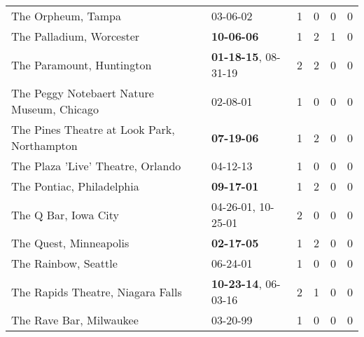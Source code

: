 \begin{longtable}{p{}p{}p{}p{}p{}p{}}
                                                           The Orpheum, Tampa &                                                03-06-02\textsuperscript{} &  1 &  0 &  0 &  0 \\
                                                     The Palladium, Worcester &                                       \textbf{10-06-06\textsuperscript{}} &  1 &  2 &  1 &  0 \\
                                                    The Paramount, Huntington &           \textbf{01-18-15\textsuperscript{}}, 08-31-19\textsuperscript{} &  2 &  2 &  0 &  0 \\
                                   The Peggy Notebaert Nature Museum, Chicago &                                                02-08-01\textsuperscript{} &  1 &  0 &  0 &  0 \\
                                  The Pines Theatre at Look Park, Northampton &                                       \textbf{07-19-06\textsuperscript{}} &  1 &  2 &  0 &  0 \\
                                            The Plaza 'Live' Theatre, Orlando &                                                04-12-13\textsuperscript{} &  1 &  0 &  0 &  0 \\
                                                    The Pontiac, Philadelphia &                                       \textbf{09-17-01\textsuperscript{}} &  1 &  2 &  0 &  0 \\
                                                         The Q Bar, Iowa City &                    04-26-01\textsuperscript{}, 10-25-01\textsuperscript{} &  2 &  0 &  0 &  0 \\
                                                       The Quest, Minneapolis &                                       \textbf{02-17-05\textsuperscript{}} &  1 &  2 &  0 &  0 \\
                                                         The Rainbow, Seattle &                                                06-24-01\textsuperscript{} &  1 &  0 &  0 &  0 \\
                                            The Rapids Theatre, Niagara Falls &           \textbf{10-23-14\textsuperscript{}}, 06-03-16\textsuperscript{} &  2 &  1 &  0 &  0 \\
                                                      The Rave Bar, Milwaukee &                                                03-20-99\textsuperscript{} &  1 &  0 &  0 &  0 \\

\end{longtable}

